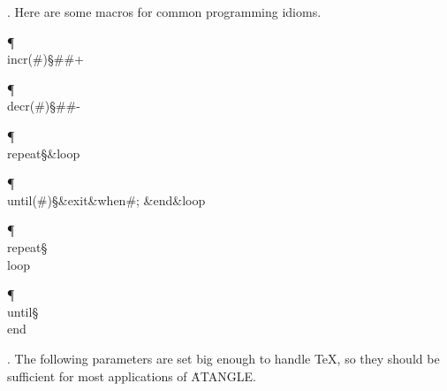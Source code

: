 . Here are some macros for common programming idioms.

\Y\P\4\D\\{incr}\?\1(\?\#\?\2)\S\?\#\?\K\?\#\?+\par
\P\4\D\\{decr}\?\1(\?\#\?\2)\S\?\#\?\K\?\#\?-\par
\P\4\D\\{repeat}\?\S\?\8\&{loop}\par
\P\4\D\\{until}\?\1(\?\#\?\2)\S\&{exit}\8\&{when}\?\8\#;\2\6
\&{end}\8\&{loop}\par
\P\4\F\\{repeat}\?\S\?\\{loop}\par
\P\4\F\\{until}\?\S\?\\{end}\par
\fi

. The following parameters are set big enough to handle \TeX, so they
should be sufficient for most applications of \.{ATANGLE}.

